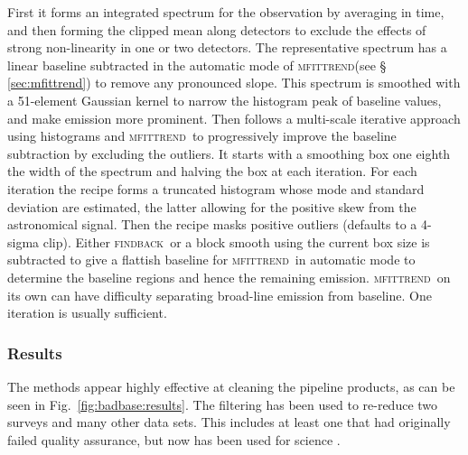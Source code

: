 \documentclass[a4paper,fleqn,usenatbib]{mnras}
\newcommand{\mfittrend}{\textsc{mfittrend}}
\newcommand{\findback}{\textsc{findback}}
\begin{document}
First it forms an integrated spectrum for the observation by averaging
in time, and then forming the clipped mean along detectors to exclude
the effects of strong non-linearity in one or two detectors.  The
representative spectrum has a linear baseline subtracted in the
automatic mode of \mfittrend (see \S\,\ref{sec:mfittrend}) to remove
any pronounced slope.  This spectrum is smoothed with a 51-element
Gaussian kernel to narrow the histogram peak of baseline values, and
make emission more prominent.  Then follows a multi-scale iterative
approach using histograms and \mfittrend\ to progressively improve the
baseline subtraction by excluding the outliers.  It starts with a
smoothing box one eighth the width of the spectrum and halving the box
at each iteration.  For each iteration the recipe forms a truncated
histogram whose mode and standard deviation are estimated, the latter
allowing for the positive skew from the astronomical signal.  Then the
recipe masks positive outliers (defaults to a 4-sigma clip).  Either
\findback\ or a block smooth using the current box size is subtracted
to give a flattish baseline for \mfittrend\ in automatic mode to
determine the baseline regions and hence the remaining emission.
\mfittrend\ on its own can have difficulty separating broad-line
emission from baseline.  One iteration is usually sufficient.

\subsubsection{Results}

The methods appear highly effective at cleaning the pipeline products,
as can be seen in Fig.~\ref{fig:badbase:results}. \citep[See][for
details of earlier reductions of these data.]{2010MNRAS.401..455C} The
filtering has been used to re-reduce two surveys and many other data
sets. This includes at least one that had originally failed quality
assurance, but now has been used for science
\citep{2013ApJ...767..126S}.
\end{document}
